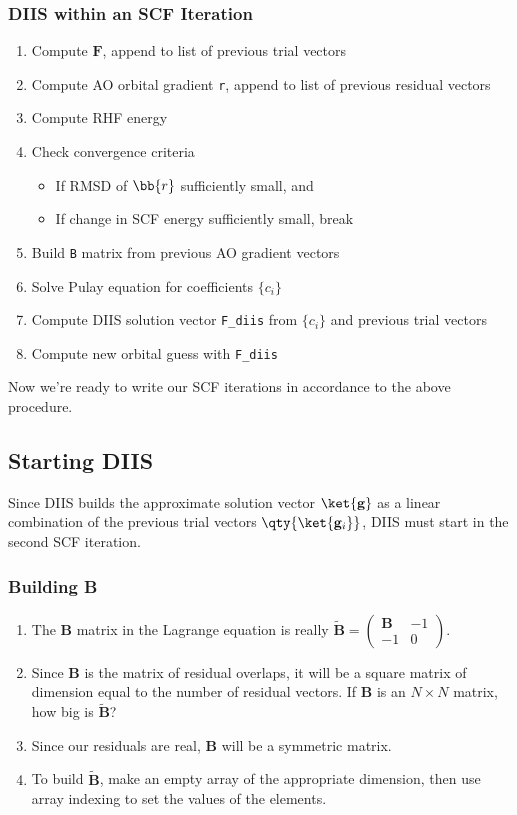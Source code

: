 \documentclass[11pt]{article}
\begin{document}
\subsubsection{DIIS within an SCF Iteration}
\begin{enumerate}
	\item Compute  $\mathbf{F}$, append to list of previous trial vectors
	\item Compute AO orbital gradient \verb|r|, append to list of previous residual vectors
	\item Compute RHF energy
	\item Check convergence criteria
	\begin{itemize}
		\item If RMSD of $\bb{r}$ sufficiently small, and
		\item If change in SCF energy sufficiently small, break
	\end{itemize}
	\item Build  \verb|B| matrix from previous AO gradient vectors
	\item Solve Pulay equation for coefficients $\{c_i\}$
	\item Compute DIIS solution vector \verb|F_diis| from $\{c_i\}$ and previous trial vectors
	\item Compute new orbital guess with \verb|F_diis|
\end{enumerate}
Now we're ready to write our SCF iterations in accordance to the above procedure.
\subsection{Starting DIIS}
Since DIIS builds the approximate solution vector $\ket{\mathbf{g}}$ as a linear combination of the previous trial vectors $\qty{\ket{\mathbf{g}_i}}$, DIIS must start in the second SCF iteration. 
\subsubsection{Building B}
\begin{enumerate}
	\item The $\mathbf{B}$ matrix in the Lagrange equation is really $\tilde{\mathbf{B}} = \begin{pmatrix} {\mathbf{B}} & -1\\ -1 & 0\end{pmatrix}$.
	\item Since $\mathbf{B}$ is the matrix of residual overlaps, it will be a square matrix of dimension equal to the number of residual vectors.  If $\mathbf{B}$ is an $N\times N$ matrix, how big is $\tilde{\mathbf{B}}$?
	\item Since our residuals are real, $\mathbf{B}$ will be a symmetric matrix.
	\item To build $\tilde{\mathbf{B}}$, make an empty array of the appropriate dimension, then use array indexing to set the values of the elements.
\end{enumerate}
\end{document}
